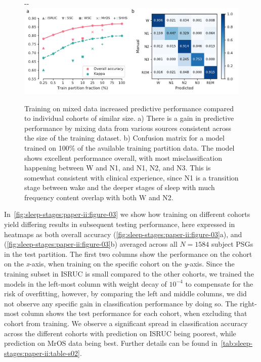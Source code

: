 \begin{figure}[tb]
    \begin{adjustwidth*}{}{-\marginparwidth-\marginparsep}
    \includegraphics[width=\linewidth]{figures/paper-ii/figure_04_a-b.pdf}
    \caption[\acs{MASSC}v2 training on mixed data.]{Training on mixed data increased predictive performance compared to individual cohorts of similar size. a) There is a gain in predictive performance by mixing data from various sources consistent across the size of the training dataset. b) Confusion matrix for a model trained on 100\% of the available training partition data. The model shows excellent performance overall, with most misclassification happening between \ac{W} and \ac{N1}, and \ac{N1}, \ac{N2}, and \ac{N3}. This is somewhat consistent with clinical experience, since \ac{N1} is a transition stage between wake and the deeper stages of sleep with much frequency content overlap with both \ac{W} and \ac{N2}.}
    \label{fig:sleep-stages:paper-ii:figure-04}
    \end{adjustwidth*}
\end{figure}

In~\cref{fig:sleep-stages:paper-ii:figure-03} we show how training on different cohorts yield differing results in subsequent testing performance, here expressed in heatmaps as both overall accuracy (\cref{fig:sleep-stages:paper-ii:figure-03}a), and \cohen (\cref{fig:sleep-stages:paper-ii:figure-03}b) averaged across all $N=1584$ subject \acp{PSG} in the test partition.
The first two columns show the performance on the cohort on the \textit{x}-axis, when training on the specific cohort on the \textit{y}-axis.
Since the training subset in \ac{ISRUC} is small compared to the other cohorts, we trained the models in the left-most column with weight decay of $10^{-4}$ to compensate for the risk of overfitting, however, by comparing the left and middle columns, we did not observe any specific gain in classification performance by doing so.
The right-most column shows the test performance for each cohort, when excluding that cohort from training.
We observe a significant spread in classification accuracy across the different cohorts with prediction on \ac{ISRUC} being poorest, while prediction on \ac{MrOS} data being best.
Further details can be found in~\cref{tab:sleep-stages:paper-ii:table-s02}.

